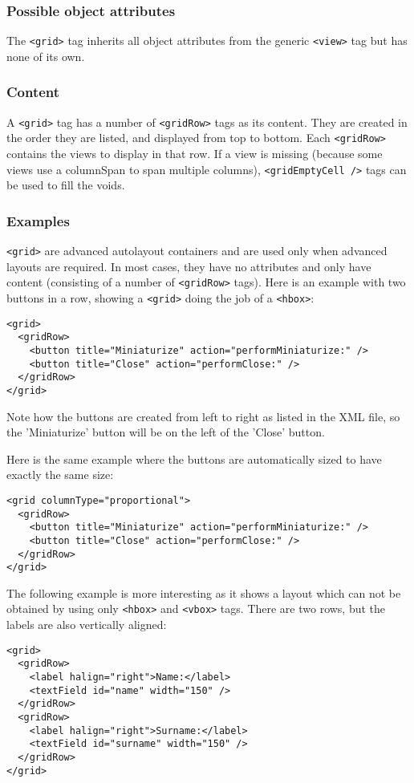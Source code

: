 \subsubsection{Possible object attributes}
The \texttt{<grid>} tag inherits all object attributes from the
generic \texttt{<view>} tag but has none of its own.

\subsubsection{Content}
A \texttt{<grid>} tag has a number of \texttt{<gridRow>} tags as its
content.  They are created in the order they are listed, and displayed
from top to bottom.  Each \texttt{<gridRow>} contains the views to
display in that row.  If a view is missing (because some views use a
columnSpan to span multiple columns), \texttt{<gridEmptyCell />} tags
can be used to fill the voids.

\subsubsection{Examples}
\texttt{<grid>} are advanced autolayout containers and are used only
when advanced layouts are required.  In most cases, they have no
attributes and only have content (consisting of a number of
\texttt{<gridRow>} tags).  Here is an example with two buttons in a
row, showing a \texttt{<grid>} doing the job of a \texttt{<hbox>}:
\begin{verbatim}
<grid>
  <gridRow>
    <button title="Miniaturize" action="performMiniaturize:" />
    <button title="Close" action="performClose:" />
  </gridRow>
</grid>
\end{verbatim}
Note how the buttons are created from left to right as listed in the
XML file, so the 'Miniaturize' button will be on the left of the
'Close' button.

Here is the same example where the buttons are automatically sized
to have exactly the same size:
\begin{verbatim}
<grid columnType="proportional">
  <gridRow>
    <button title="Miniaturize" action="performMiniaturize:" />
    <button title="Close" action="performClose:" />
  </gridRow>
</grid>
\end{verbatim}

The following example is more interesting as it shows a layout which
can not be obtained by using only \texttt{<hbox>} and \texttt{<vbox>}
tags.  There are two rows, but the labels are also vertically aligned:
\begin{verbatim}
<grid>
  <gridRow>
    <label halign="right">Name:</label>
    <textField id="name" width="150" />
  </gridRow>
  <gridRow>
    <label halign="right">Surname:</label>
    <textField id="surname" width="150" />
  </gridRow>
</grid>
\end{verbatim}

